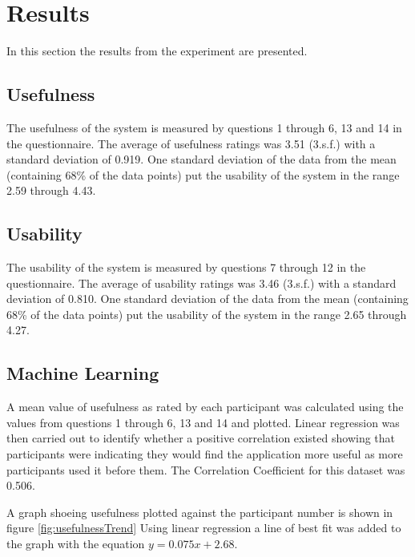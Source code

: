 \documentclass[authoryearcitations]{UoYCSproject}
\begin{document}
\section{Results}
\label{sec:results}

In this section the results from the experiment are presented.

\subsection{Usefulness}
\label{subsec:resultsUsefulness}

The usefulness of the system is measured by questions 1 through 6, 13 and 14 in the questionnaire. The average of usefulness ratings was 3.51 (3.s.f.) with a standard deviation of 0.919. One standard deviation of the data from the mean (containing 68\% of the data points) put the usability of the system in the range 2.59 through 4.43.

\subsection{Usability}
\label{subsec:resultsUsability}

The usability of the system is measured by questions 7 through 12 in the questionnaire.  The average of usability ratings was 3.46 (3.s.f.) with a standard deviation of 0.810. One standard deviation of the data from the mean (containing 68\% of the data points) put the usability of the system in the range 2.65 through 4.27.

\subsection{Machine Learning}
\label{subsec:resultsMachineLearning}

A mean value of usefulness as rated by each participant was calculated using the values from questions 1 through 6, 13 and 14 and plotted. Linear regression was then carried out to identify whether a positive correlation existed showing that participants were indicating they would find the application more useful as more participants used it before them. The Correlation Coefficient for this dataset was 0.506.

A graph shoeing usefulness plotted against the participant number is shown in figure \ref{fig:usefulnessTrend} Using linear regression a line of best fit was added to the graph with the equation $y = 0.075 x + 2.68$.
\end{document}
